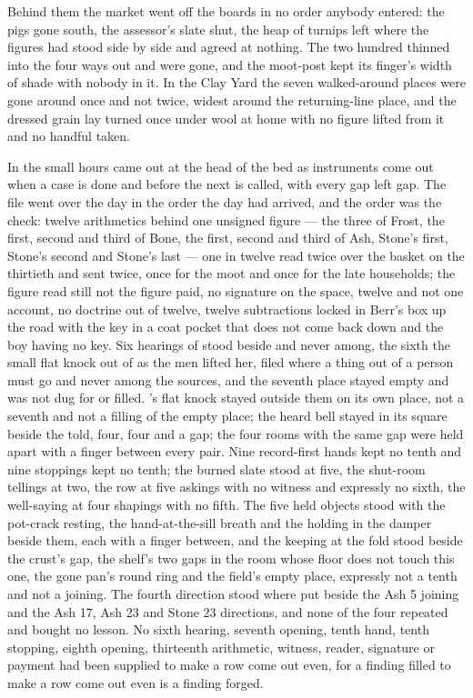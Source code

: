 Behind them the market went off the boards in no order anybody entered: the pigs gone south, the assessor's slate shut, the heap of turnips left where the figures had stood side by side and agreed at nothing. The two hundred thinned into the four ways out and were gone, and the moot-post kept its finger's width of shade with nobody in it. In the Clay Yard the seven walked-around places were gone around once and not twice, widest around the returning-line place, and the dressed grain lay turned once under wool at home with no figure lifted from it and no handful taken.

\scenebreak

In the small hours  came out at the head of the bed as instruments come out when a case is done and before the next is called, with every gap left gap. The file went over the day in the order the day had arrived, and the order was the check: twelve arithmetics behind one unsigned figure --- the three of Frost, the first, second and third of Bone, the first, second and third of Ash, Stone's first, Stone's second and Stone's last --- one in twelve read twice over the basket on the thirtieth and sent twice, once for the moot and once for the late households; the figure read still not the figure paid, no signature on the space, twelve and not one account, no doctrine out of twelve, twelve subtractions locked in Berr's box up the road with the key in a coat pocket that does not come back down and the boy having no key. Six hearings of  stood beside and never among, the sixth the small flat knock out of  as the men lifted her, filed where a thing out of a person must go and never among the sources, and the seventh place stayed empty and was not dug for or filled. 's flat knock stayed outside them on its own place, not a seventh and not a filling of the empty place; the heard bell stayed in its square beside the told, four, four and a gap; the four rooms with the same gap were held apart with a finger between every pair. Nine record-first hands kept no tenth and nine stoppings kept no tenth; the burned slate stood at five, the shut-room tellings at two, the row at five askings with no witness and expressly no sixth, the well-saying at four shapings with no fifth. The five held objects stood with the pot-crack resting, the hand-at-the-sill breath and the holding in the damper beside them, each with a finger between, and the keeping at the fold stood beside the crust's gap, the shelf's two gaps in the room whose floor does not touch this one, the gone pan's round ring and the field's empty place, expressly not a tenth and not a joining. The fourth direction stood where put beside the Ash 5 joining and the Ash 17, Ash 23 and Stone 23 directions, and none of the four repeated and bought no lesson. No sixth hearing, seventh opening, tenth hand, tenth stopping, eighth opening, thirteenth arithmetic, witness, reader, signature or payment had been supplied to make a row come out even, for a finding filled to make a row come out even is a finding forged.

